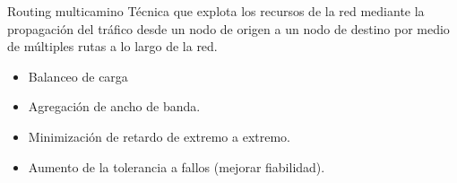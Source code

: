 \documentclass[10pt,spanish,xcolor={svgnames}]{beamer}
\begin{document}
\begin{frame}{Routing multicamino}
\vspace*{-2em}
Técnica que explota los recursos de la red mediante la propagación del tráfico desde un nodo de origen a un nodo de destino por medio de múltiples rutas a lo largo de la red.
\begin{alertblock}{}
\begin{itemize}
\item Balanceo de carga
\item Agregación de ancho de banda.
\item Minimización de retardo de extremo a extremo.
\item Aumento de la tolerancia a fallos (mejorar fiabilidad).
\end{itemize}
\end{alertblock}
\end{frame}
\end{document}
